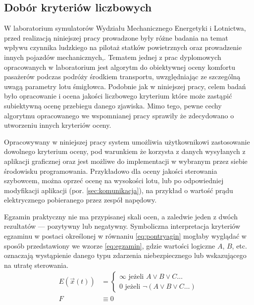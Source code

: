 \subsection{Dobór kryteriów liczbowych}
\label{sec:dobor-kryteriow}
W laboratorium symulatorów Wydziału Mechanicznego Energetyki i Lotnictwa, przed realizacją niniejszej pracy prowadzone były różne badania na temat wpływu czynnika ludzkiego na pilotaż statków powietrznych oraz prowadzenie innych pojazdów mechanicznych\cite{kopyt2017},\cite{kopyt2019}. Tematem jednej z prac dyplomowych opracowanych w laboratorium\cite{tomaszewska2019} jest algorytm do obiektywnej oceny komfortu pasażerów podczas podróży środkiem transportu, uwzględniając ze szczególną uwagą parametry lotu śmigłowca. Podobnie jak w niniejszej pracy, celem badań było opracowanie i ocena jakości liczbowego kryterium które może zastąpić subiektywną ocenę przebiegu danego zjawiska. Mimo tego, pewne cechy algorytmu opracowanego we wspomnianej pracy sprawiły że zdecydowano o utworzeniu innych kryteriów oceny.

Opracowywany w niniejszej pracy system umożliwia użytkownikowi zastosowanie dowolnego kryterium oceny, pod warunkiem że korzysta z  danych wysyłanych z aplikacji graficznej oraz jest możliwe do implementacji w wybranym przez siebie środowisku programowania. Przykładowo dla oceny jakości sterowania szybowcem, można oprzeć ocenę na wysokości lotu, lub po odpowiedniej modyfikacji aplikacji (por. \ref{sec:komunikacja}), na przykład o wartość prądu elektrycznego pobieranego przez zespół napędowy.

Egzamin praktyczny nie ma przypisanej skali ocen, a zaledwie jeden z dwóch rezultatów --- pozytywny lub negatywny. Symboliczna interpretacja kryteriów egzaminu w postaci określonej w równaniu \ref{eq:pontryagin} mogłaby wyglądać w sposób przedstawiony we wzorze \ref{eq:egzamin}, gdzie wartości logiczne $ A $, $ B $, etc. oznaczają wystąpienie danego typu zdarzenia niebezpiecznego lub wskazującego na utratę sterowania.
\begin{align}
    \label{eq:egzamin}
    E\left( \vec{x}(t) \right) &=
    \left\{
        \begin{array}{ll}
            \infty \mbox{ jeżeli } A \lor B \lor C \dots \\
            0 \mbox{ jeżeli } \neg ( A \lor B \lor C \dots)
        \end{array}
    \right.
    \\
    F & \equiv 0
\end{align}


